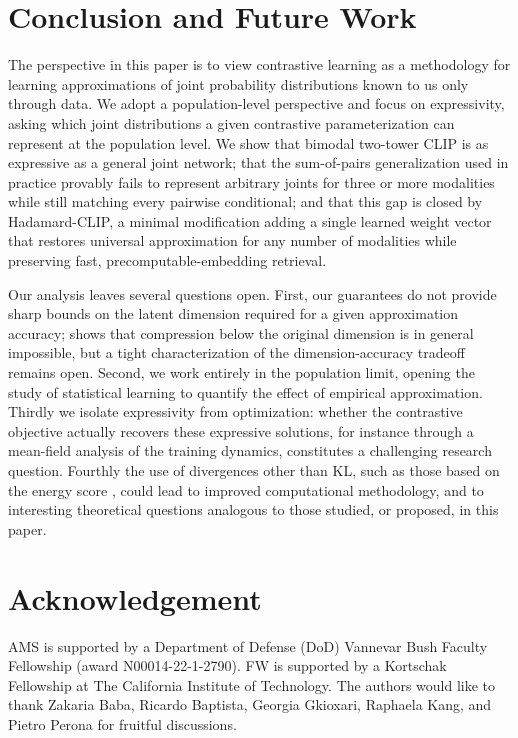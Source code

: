 \documentclass{article}
\begin{document}
\section{Conclusion and Future Work}
The perspective in this paper is to view contrastive learning as a
methodology for learning approximations of joint probability distributions
known to us only through data. We adopt a population-level perspective and
focus on expressivity, asking which joint distributions a given contrastive
parameterization can represent at the population level. We show that
bimodal two-tower CLIP is as expressive as a general joint network; that
the sum-of-pairs generalization used in practice provably fails to
represent arbitrary joints for three or more modalities while still
matching every pairwise conditional; and that this gap is closed by
Hadamard-CLIP, a minimal modification adding a single learned weight vector
that restores universal approximation for any number of modalities while
preserving fast, precomputable-embedding retrieval.

Our analysis leaves several questions open. First, our guarantees do not
provide sharp bounds on the latent dimension required for a given
approximation accuracy; 
shows that compression below the original dimension is in general
impossible, but a tight characterization of the dimension-accuracy tradeoff
remains open. Second, we work entirely in the population limit, opening the
study of statistical learning to quantify the effect of empirical
approximation. Thirdly we isolate expressivity from optimization: whether
the contrastive objective actually recovers these expressive solutions, for
instance through a mean-field analysis of the training dynamics,
constitutes a challenging research question. Fourthly the use of
divergences other than KL, such as those based on the energy score
\citep{waghmareProperScoringRules2026}, could lead to improved
computational methodology, and to interesting theoretical questions
analogous to those studied, or proposed, in this paper.

\section*{Acknowledgement}
AMS is supported by a Department of Defense (DoD) Vannevar Bush Faculty
Fellowship (award N00014-22-1-2790). FW is supported by a Kortschak
Fellowship at The California Institute of Technology.
The authors would like to thank Zakaria Baba, Ricardo Baptista,
Georgia Gkioxari, Raphaela Kang, and Pietro Perona
for fruitful discussions.

\appendix
\end{document}
